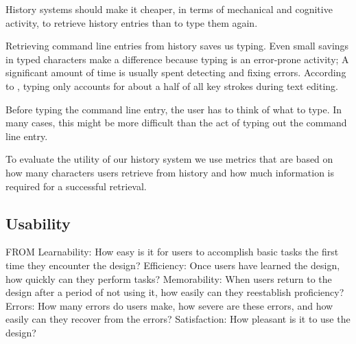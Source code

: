 History systems should make it cheaper, in terms of mechanical and cognitive activity, to retrieve history entries than to type them again.\cite{greenberg1993computer}

Retrieving command line entries from history saves us typing. Even small savings in typed characters make a difference because typing is an error-prone activity; A significant amount of time is usually spent detecting and fixing errors. According to \cite{whiteside1982people}, typing only accounts for about a half of all key strokes during text editing. 


Before typing the command line entry, the user has to think of what to type. In many cases, this might be more difficult than the act of typing out the command line entry.   


To evaluate the utility of our history system we use metrics that are based on how many characters users retrieve from history and how much information is required for a successful retrieval.

\subsection{Usability}


FROM \cite{nielsen2012usability}
Learnability: How easy is it for users to accomplish basic tasks the first time they encounter the design?
Efficiency: Once users have learned the design, how quickly can they perform tasks?
Memorability: When users return to the design after a period of not using it, how easily can they reestablish proficiency?
Errors: How many errors do users make, how severe are these errors, and how easily can they recover from the errors?
Satisfaction: How pleasant is it to use the design?


% 

